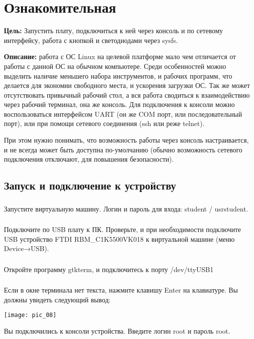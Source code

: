 \chapter{Ознакомительная}
\textbf{Цель:} Запустить плату, подключиться к ней через консоль и по сетевому интерфейсу, работа с кнопкой и светодиодами через sysfs.

\textbf{Описание:} работа с ОС Linux на целевой платформе мало чем отличается от работы с данной ОС на обычном компьютере. Среди особенностей можно выделить наличие меньшего набора инструментов, и рабочих программ, что делается для экономии свободного места, и ускорения загрузки ОС. Так же может отсутствовать привычный рабочий стол, а вся работа сводиться к взаимодействию через рабочий терминал, она же консоль. Для подключения к консоли можно воспользоваться интерфейсом UART (он же COM порт, или последовательный порт), или при помощи сетевого соединения (ssh или реже telnet). 

При этом нужно понимать, что возможность работы через консоль настраивается, и не всегда может быть доступна по-умолчанию (обычно возможность сетевого подключения отключают, для повышения безопасности). 


\section{Запуск и подключение к устройству}

\subsection{}Запустите виртуальную машину. Логин и пароль для входа: student / usrstudent.

\subsection{}Подключите по USB плату к ПК. Проверьте, и при необходимости подключите USB устройство FTDI RBM\_C1K5500VK018 к виртуальной машине (меню Device→USB).

\subsection{}Откройте программу gtkterm, и подключитесь к порту /dev/ttyUSB1

\subsection{}Если в окне терминала нет текста, нажмите клавишу Enter на клавиатуре. Вы должны увидеть следующий вывод:
\begin{center}
	\texttt{[image: pic\_08]}
\end{center}
Вы подключились к консоли устройства. Введите логин root и пароль root.

